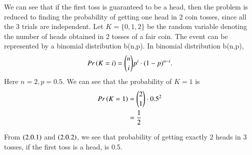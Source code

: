 We can see that if the first toss is guaranteed to be a head, then the problem is reduced to finding the probability of getting one head in 2 coin tosses, since all the 3 trials are independent.
Let $K=\{0, 1, 2\}$ be the random variable denoting the number of heads obtained in 2 tosses of a fair coin. The event can be represented by a binomial distribution b(n,p).
In binomial distribution b(n,p), 
\begin{align}
Pr\left(K=i\right)= \binom{n}{i}p^i \cdot (1-p)^{n-i}.
\end{align}
Here $n=2, p=0.5$.
 We can see that the probability of $K=1$ is 
 \begin{align}
 Pr\left(K=1\right)&=\binom{2}{1} \cdot 0.5^2\\
 &=\frac{1}{2}
 \end{align}
 
From $\left(2.0.1\right)$ and $\left(2.0.2\right)$, we see that probability of getting exactly 2 heads in 3 tosses, if the first toss is a head, is 0.5.